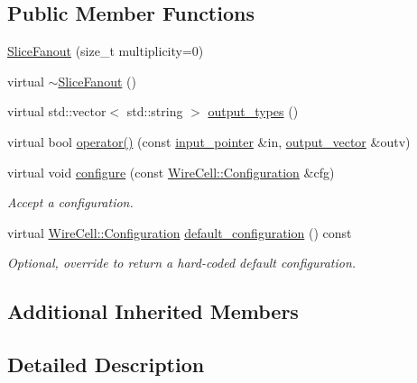 \subsection*{Public Member Functions}
\begin{DoxyCompactItemize}
\item 
\hyperlink{class_wire_cell_1_1_img_1_1_slice_fanout_a00de54e667342194bcf38201c5fab385}{Slice\+Fanout} (size\+\_\+t multiplicity=0)
\item 
virtual \hyperlink{class_wire_cell_1_1_img_1_1_slice_fanout_a46a2065845f45f58319bdbb1c9a6dd04}{$\sim$\+Slice\+Fanout} ()
\item 
virtual std\+::vector$<$ std\+::string $>$ \hyperlink{class_wire_cell_1_1_img_1_1_slice_fanout_a98fe441e7e47306ff0352f547e9b9066}{output\+\_\+types} ()
\item 
virtual bool \hyperlink{class_wire_cell_1_1_img_1_1_slice_fanout_a054b9ee6d864e5734e4c21982d05e11c}{operator()} (const \hyperlink{class_wire_cell_1_1_i_fanout_node_aefd36d56a531edf1990fe6e263d9c266}{input\+\_\+pointer} \&in, \hyperlink{class_wire_cell_1_1_i_fanout_node_a650cda83709781daac2d67af7c3706df}{output\+\_\+vector} \&outv)
\item 
virtual void \hyperlink{class_wire_cell_1_1_img_1_1_slice_fanout_a1a21cb99502e3c2cc219b37c0f1ec1e5}{configure} (const \hyperlink{namespace_wire_cell_a9f705541fc1d46c608b3d32c182333ee}{Wire\+Cell\+::\+Configuration} \&cfg)
\begin{DoxyCompactList}\small\item\em Accept a configuration. \end{DoxyCompactList}\item 
virtual \hyperlink{namespace_wire_cell_a9f705541fc1d46c608b3d32c182333ee}{Wire\+Cell\+::\+Configuration} \hyperlink{class_wire_cell_1_1_img_1_1_slice_fanout_aa76ff5e26f5ab807a7caecfc0939ff13}{default\+\_\+configuration} () const
\begin{DoxyCompactList}\small\item\em Optional, override to return a hard-\/coded default configuration. \end{DoxyCompactList}\end{DoxyCompactItemize}
\subsection*{Additional Inherited Members}


\subsection{Detailed Description}


